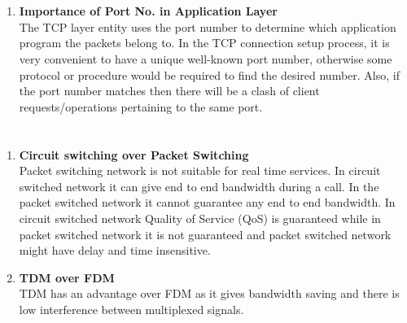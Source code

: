 \documentclass[12pt]{article}
\begin{document}
\section{}
    \begin{enumerate}[label=(\alph*)]
    
    \item \textbf{Importance of Port No. in Application Layer} \\
    The TCP layer entity uses the port number to determine which application program the packets belong to. In the TCP connection setup process, it is very convenient to have a unique well-known port number, otherwise some protocol or procedure would be required to find the desired number.
    Also, if the port number matches then there will be a clash of client requests/operations pertaining to the same port.

    \end{enumerate} 
    
    \section{}
    \begin{enumerate}[label=(\alph*)]
    
    \item \textbf{Circuit switching over Packet Switching} \\
    Packet switching network is not suitable for real time services. In circuit switched network it can give end to end bandwidth during a call. In the packet switched network it cannot guarantee any end to end bandwidth. In circuit switched network Quality of Service (QoS) is guaranteed while in packet switched network it is not guaranteed and packet switched network might have delay and time insensitive.

    \item \textbf{TDM over FDM} \\
    TDM has an advantage over FDM as it gives bandwidth saving and there is low interference between multiplexed signals.

    \end{enumerate}  
\end{document}
